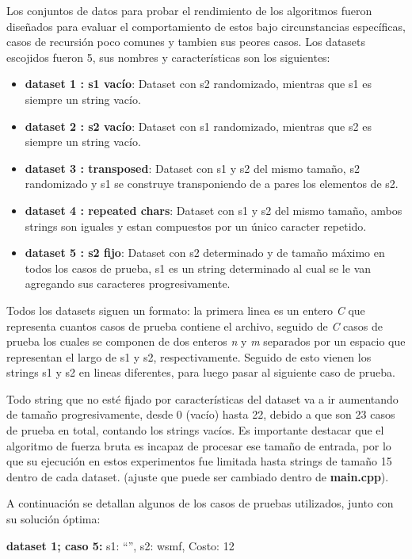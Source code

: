 
Los conjuntos de datos para probar el rendimiento de los algoritmos fueron diseñados para evaluar el comportamiento de estos bajo circunstancias específicas, casos de recursión poco comunes y tambien sus peores casos. 
Los datasets escojidos fueron 5, sus nombres y características son los siguientes:

\begin{itemize}
    \item \textbf{dataset 1 : s1 vacío}: Dataset con s2 randomizado, mientras que s1 es siempre un string vacío.
    \item \textbf{dataset 2 : s2 vacío}: Dataset con s1 randomizado, mientras que s2 es siempre un string vacío.
    \item \textbf{dataset 3 : transposed}: Dataset con s1 y s2 del mismo tamaño, s2 randomizado y s1 se construye transponiendo de a pares los elementos de s2.
    \item \textbf{dataset 4 : repeated chars}: Dataset con s1 y s2 del mismo tamaño, ambos strings son iguales y estan compuestos por un único caracter repetido.
    \item \textbf{dataset 5 : s2 fijo}: Dataset con s2 determinado y de tamaño máximo en todos los casos de prueba, s1 es un string determinado al cual se le van agregando 
    sus caracteres progresivamente.
\end{itemize}

Todos los datasets siguen un formato: la primera linea es un entero \textit{C} que representa cuantos casos de prueba contiene el archivo, seguido de \textit{C} casos de prueba los 
cuales se componen de dos enteros \textit{n} y \textit{m} separados por un espacio que representan el largo de s1 y s2, respectivamente. Seguido de esto vienen los strings s1 y s2 en lineas diferentes, para 
luego pasar al siguiente caso de prueba.

Todo string que no esté fijado por características del dataset va a ir aumentando de tamaño progresivamente, desde 0 (vacío) hasta 22, debido a que son 23 casos de prueba en total, contando los strings vacíos. Es importante destacar que 
el algoritmo de fuerza bruta es incapaz de procesar ese tamaño de entrada, por lo que su ejecución en estos experimentos fue limitada hasta strings de tamaño 15 dentro de cada dataset. (ajuste que puede ser cambiado 
dentro de \textbf{main.cpp}).

A continuación se detallan algunos de los casos de pruebas utilizados, junto con su solución óptima:

\textbf{dataset 1; caso 5:} s1: ``'', s2: wsmf, Costo: 12

